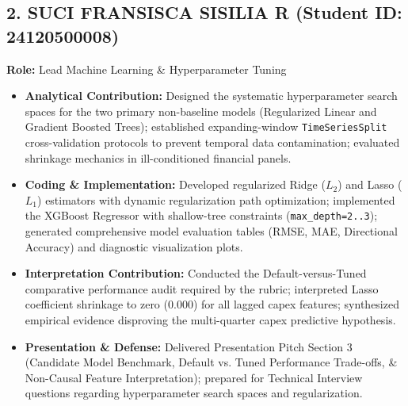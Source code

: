 \documentclass[11pt,a4paper]{article}
\begin{document}
\subsection{2. SUCI FRANSISCA SISILIA R (Student ID: 24120500008)}
\textbf{Role:} Lead Machine Learning \& Hyperparameter Tuning
\begin{itemize}[leftmargin=1.5em, itemsep=0.2em]
    \item \textbf{Analytical Contribution:} Designed the systematic hyperparameter search spaces for the two primary non-baseline models (Regularized Linear and Gradient Boosted Trees); established expanding-window \texttt{TimeSeriesSplit} cross-validation protocols to prevent temporal data contamination; evaluated shrinkage mechanics in ill-conditioned financial panels.
    \item \textbf{Coding \& Implementation:} Developed regularized Ridge ($L_2$) and Lasso ($L_1$) estimators with dynamic regularization path optimization; implemented the XGBoost Regressor with shallow-tree constraints (\texttt{max\_depth=2..3}); generated comprehensive model evaluation tables (RMSE, MAE, Directional Accuracy) and diagnostic visualization plots.
    \item \textbf{Interpretation Contribution:} Conducted the Default-versus-Tuned comparative performance audit required by the rubric; interpreted Lasso coefficient shrinkage to zero ($0.000$) for all lagged capex features; synthesized empirical evidence disproving the multi-quarter capex predictive hypothesis.
    \item \textbf{Presentation \& Defense:} Delivered Presentation Pitch Section 3 (Candidate Model Benchmark, Default vs. Tuned Performance Trade-offs, & Non-Causal Feature Interpretation); prepared for Technical Interview questions regarding hyperparameter search spaces and regularization.
\end{itemize}

\vspace{0.4em}
\end{document}
